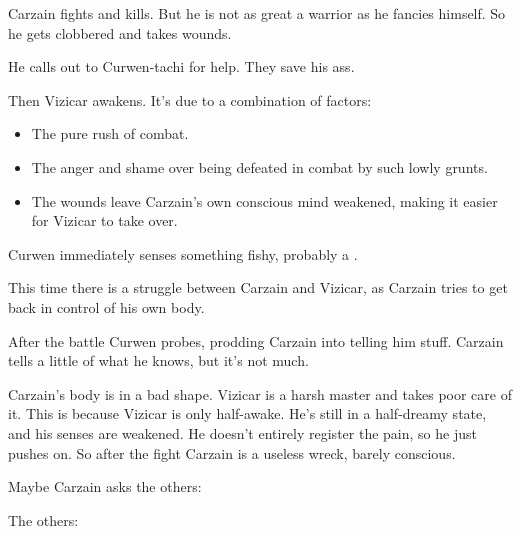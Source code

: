 Carzain fights and kills. 
But he is not as great a warrior as he fancies himself. 
So he gets clobbered and takes wounds. 

He calls out to Curwen-tachi for help. 
They save his ass. 

Then Vizicar awakens. 
It's due to a combination of factors: 

\begin{itemize}
  \item The pure rush of combat. 
  \item The anger and shame over being defeated in combat by such lowly grunts. 
  \item The wounds leave Carzain's own conscious mind weakened, making it easier for Vizicar to take over. 
\end{itemize}




Curwen immediately senses something fishy, probably a \vertexspike{}. 

This time there is a struggle between Carzain and Vizicar, as Carzain tries to get back in control of his own body. 


After the battle Curwen probes, prodding Carzain into telling him stuff. Carzain tells a little of what he knows, but it's not much. 

Carzain's body is in a bad shape. 
Vizicar is a harsh master and takes poor care of it. 
This is because Vizicar is only half-awake. 
He's still in a half-dreamy state, and his senses are weakened. 
He doesn't entirely register the pain, so he just pushes on. 
So after the fight Carzain is a useless wreck, barely conscious. 

Maybe Carzain asks the others:  

The others: 

